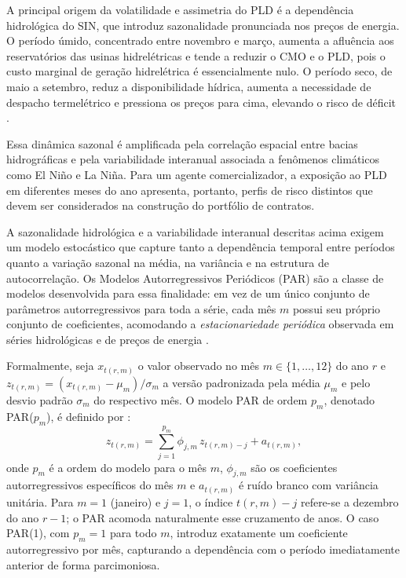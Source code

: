 A principal origem da volatilidade e assimetria do PLD é a dependência hidrológica do SIN, que introduz sazonalidade pronunciada nos preços de energia. O período úmido, concentrado entre novembro e março, aumenta a afluência aos reservatórios das usinas hidrelétricas e tende a reduzir o CMO e o PLD, pois o custo marginal de geração hidrelétrica é essencialmente nulo. O período seco, de maio a setembro, reduz a disponibilidade hídrica, aumenta a necessidade de despacho termelétrico e pressiona os preços para cima, elevando o risco de déficit \cite{mme2002}.

Essa dinâmica sazonal é amplificada pela correlação espacial entre bacias hidrográficas e pela variabilidade interanual associada a fenômenos climáticos como El Niño e La Niña. Para um agente comercializador, a exposição ao PLD em diferentes meses do ano apresenta, portanto, perfis de risco distintos que devem ser considerados na construção do portfólio de contratos.

A sazonalidade hidrológica e a variabilidade interanual descritas acima exigem um modelo estocástico que capture tanto a dependência temporal entre períodos quanto a variação sazonal na média, na variância e na estrutura de autocorrelação. Os Modelos Autorregressivos Periódicos (PAR) são a classe de modelos desenvolvida para essa finalidade: em vez de um único conjunto de parâmetros autorregressivos para toda a série, cada mês $m$ possui seu próprio conjunto de coeficientes, acomodando a \emph{estacionariedade periódica} observada em séries hidrológicas e de preços de energia \cite{reis2013}.

Formalmente, seja $x_{t(r,m)}$ o valor observado no mês $m \in \{1,\ldots,12\}$ do ano $r$ e $z_{t(r,m)} = (x_{t(r,m)} - \mu_m)/\sigma_m$ a versão padronizada pela média $\mu_m$ e pelo desvio padrão $\sigma_m$ do respectivo mês. O modelo PAR de ordem $p_m$, denotado PAR($p_m$), é definido por \cite{reis2013}:
\begin{equation}
  z_{t(r,m)} = \sum_{j=1}^{p_m} \phi_{j,m}\, z_{t(r,m)-j} + a_{t(r,m)},
  \label{eq:par_model}
\end{equation}
onde $p_m$ é a ordem do modelo para o mês $m$, $\phi_{j,m}$ são os coeficientes autorregressivos específicos do mês $m$ e $a_{t(r,m)}$ é ruído branco com variância unitária. Para $m = 1$ (janeiro) e $j = 1$, o \'indice $t(r,m)-j$ refere-se a dezembro do ano $r-1$; o PAR acomoda naturalmente esse cruzamento de anos. O caso PAR(1), com $p_m = 1$ para todo $m$, introduz exatamente um coeficiente autorregressivo por mês, capturando a dependência com o período imediatamente anterior de forma parcimoniosa.

